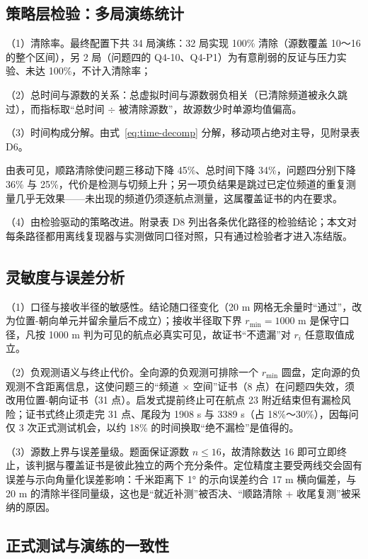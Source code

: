 \documentclass[12pt,a4paper]{ctexart}
\newcommand{\upcite}[1]{\textsuperscript{\cite{#1}}}
\begin{document}
\subsection{策略层检验：多局演练统计}

（1）清除率。最终配置下共 34 局演练：32 局实现 100\% 清除（源数覆盖 10～16 的整个区间），另 2 局（问题四的 Q4-10、Q4-P1）为有意削弱的反证与压力实验、未达 100\%，不计入清除率；



（2）总时间与源数的关系：总虚拟时间与源数弱负相关（已清除频道被永久跳过），而指标取“总时间 $\div$ 被清除源数”，故源数少时单源均值偏高。

（3）时间构成分解。由式~\eqref{eq:time-decomp} 分解，移动项占绝对主导，见附录表 D6。


由表可见，顺路清除使问题三移动下降 45\%、总时间下降 34\%，问题四分别下降 36\% 与 25\%，代价是检测与切频上升；另一项负结果是跳过已定位频道的重复测量几乎无效果——未出现的频道仍须逐航点测量，这属覆盖证书的内在要求。

（4）由检验驱动的策略改进。附录表 D8 列出各条优化路径的检验结论；本文对每条路径都用离线复现器与实测做同口径对照，只有通过检验者才进入冻结版。


\subsection{灵敏度\upcite{ref:GSA}与误差分析}

（1）口径与接收半径的敏感性。结论随口径变化（20 m 网格无余量时“通过”，改为位置-朝向单元并留余量后不成立）；接收半径取下界 $r_{\min}=1000$ m 是保守口径，凡按 1000 m 判为可见的航点必真实可见，故证书“不遗漏”对 $r_i$ 任意取值成立。

（2）负观测语义与终止代价。全向源的负观测可排除一个 $r_{\min}$ 圆盘，定向源的负观测不含距离信息，这使问题三的“频道 $\times$ 空间”证书（8 点）在问题四失效，须改用位置-朝向证书（31 点）。启发式提前终止可在航点 23 附近结束但有漏检风险；证书式终止须走完 31 点、尾段为 1908 s 与 3389 s（占 18\%～30\%），因每问仅 3 次正式测试机会，以约 18\% 的时间换取“绝不漏检”是值得的。

（3）源数上界与误差量级。题面保证源数 $n\le16$，故清除数达 16 即可立即终止，该判据与覆盖证书是彼此独立的两个充分条件。定位精度主要受两线交会固有误差与示向角量化误差影响：千米距离下 1° 的示向误差约合 17 m 横向偏差，与 20 m 的清除半径同量级，这也是“就近补测”被否决、“顺路清除 + 收尾复测”被采纳的原因。

\subsection{正式测试与演练的一致性}
\end{document}
